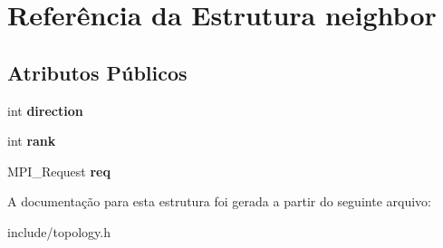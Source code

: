 \hypertarget{structneighbor}{
\section{Referência da Estrutura neighbor}
\label{structneighbor}
}
\subsection*{Atributos Públicos}
\begin{DoxyCompactItemize}
\item 
\hypertarget{structneighbor_afe0f89d7ddc268b6ae9f9202e98303c9}{
int {\bfseries direction}}
\label{structneighbor_afe0f89d7ddc268b6ae9f9202e98303c9}

\item 
\hypertarget{structneighbor_a16f4132356ff1fb2b7c188b366aacad6}{
int {\bfseries rank}}
\label{structneighbor_a16f4132356ff1fb2b7c188b366aacad6}

\item 
\hypertarget{structneighbor_ac237f4deb818c9713bbdbe493673081c}{
MPI\_\-Request {\bfseries req}}
\label{structneighbor_ac237f4deb818c9713bbdbe493673081c}

\end{DoxyCompactItemize}


A documentação para esta estrutura foi gerada a partir do seguinte arquivo:\begin{DoxyCompactItemize}
\item 
include/topology.h\end{DoxyCompactItemize}
